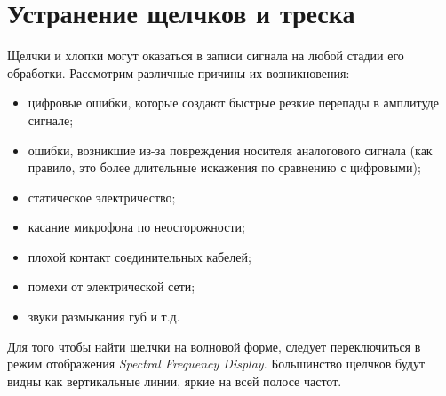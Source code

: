 \documentclass{beamer}
\begin{document}
\section{Устранение щелчков и треска}
\begin{frame}
Щелчки и хлопки могут оказаться в записи сигнала на любой стадии его обработки. Рассмотрим различные причины их возникновения:
\begin{itemize}
  \item цифровые ошибки, которые создают быстрые резкие перепады в амплитуде сигнале;
  \item ошибки, возникшие из-за повреждения носителя аналогового сигнала (как правило, это более длительные искажения по сравнению с цифровыми);
  \item статическое электричество;
  \item касание микрофона по неосторожности;
  \item плохой контакт соединительных кабелей;
  \item помехи от электрической сети;
  \item звуки размыкания губ и т.д.
\end{itemize}
\end{frame}

\begin{frame}
Для того чтобы найти щелчки на волновой форме, следует переключиться в режим отображения \textit{Spectral Frequency Display}. Большинство щелчков будут видны как вертикальные линии, яркие на всей полосе частот.
\end{frame}
\end{document}
